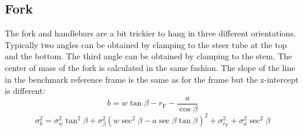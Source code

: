 \documentclass{bmd2010p}
\begin{document}
\subsection{Fork}
The fork and handlebars are a bit trickier to hang in three different
orientations. Typically two angles can be obtained by clamping to the steer
tube at the top and the bottom. The third angle can be obtained by clamping to
the stem. The center of mass of the fork is calculated in the same fashion. The
slope of the line in the benchmark reference frame is the same as for the
frame but the z-intercept is different:
\begin{equation}
    b = w\tan{\beta} - r_\mathrm{F} - \frac{a}{\cos{\beta}} 
    \label{eq:zIntFork}
\end{equation}
\begin{equation}
    \sigma_{b}^{2} = \sigma_{w}^{2}\tan^{2}\beta +
    \sigma_{\beta}^{2}\left(w\sec^{2}\beta -
    a\sec\beta\tan\beta\right)^{2} + \sigma_{r_\mathrm{F}}^{2} +
    \sigma_{a}^{2}\sec^{2}\beta
    \label{eq:zIntForkVar}
\end{equation}
\end{document}
